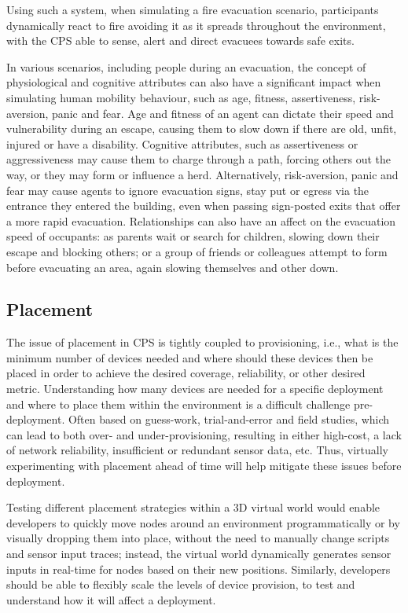 Using such a system, when simulating a fire evacuation scenario, participants dynamically react to fire avoiding it as it spreads throughout the environment, with the CPS able to sense, alert and direct evacuees towards safe exits.

In various scenarios, including people during an evacuation, the concept of physiological and cognitive attributes can also have a significant impact when simulating human mobility behaviour\cite{Johnson2008}, such as age, fitness, assertiveness, risk-aversion, panic and fear\cite{TCPP_Personality_Profile}. Age and fitness of an agent can dictate their speed and vulnerability during an escape, causing them to slow down if there are old, unfit, injured or have a disability. Cognitive attributes, such as assertiveness or aggressiveness may cause them to charge through a path, forcing others out the way, or they may form or influence a herd. Alternatively, risk-aversion, panic and fear may cause agents to ignore evacuation signs, stay put or egress via the entrance they entered the building, even when passing sign-posted exits that offer a more rapid evacuation\cite{Johnson2008,Helbing,Sime1983}. Relationships can also have an affect on the evacuation speed of occupants: as parents wait or search for children, slowing down their escape and blocking others; or a group of friends or colleagues attempt to form before evacuating an area, again slowing themselves and other down.


\subsection{Placement}
\label{sub:requirements_3D design and placement}
The issue of placement in CPS is tightly coupled to provisioning, i.e., what is the minimum number of devices needed and where should these devices then be placed in order to achieve the desired coverage, reliability, or other desired metric. 
Understanding how many devices are needed for a specific deployment and where to place them within the environment is a difficult challenge pre-deployment. Often based on guess-work, trial-and-error and field studies, which can lead to both over- and under-provisioning, resulting in either high-cost, a lack of network reliability, insufficient or redundant sensor data, etc. 
Thus, virtually experimenting with placement ahead of time will help mitigate these issues before deployment. 

Testing different placement strategies within a 3D virtual world would enable developers to quickly move nodes around an environment programmatically or by visually dropping them into place, without the need to manually change scripts and sensor input traces; instead, the virtual world dynamically generates sensor inputs in real-time for nodes based on their new positions. Similarly, developers should be able to flexibly scale the levels of device provision, to test and understand how it will affect a deployment. 


